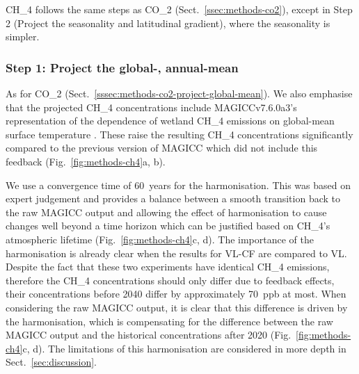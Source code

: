 CH_4 follows the same steps as CO_2 (Sect.~\ref{ssec:methods-co2}),
except in Step 2 (Project the seasonality and latitudinal gradient),
where the seasonality is simpler.

\subsubsection{Step 1: Project the global-, annual-mean}
\label{sssec:methods-ch4-project-global-mean}

As for CO_2 (Sect.~\ref{sssec:methods-co2-project-global-mean}).
We also emphasise that the projected CH_4 concentrations
include MAGICCv7.6.0a3's representation of the dependence of
wetland CH_4 emissions on global-mean surface temperature \citep{sloughter_magicc-ch4-feedbacks_2026}.
These raise the resulting CH_4 concentrations significantly
compared to the previous version of MAGICC which did not include this feedback (Fig.~\ref{fig:methods-ch4}a, b).

We use a convergence time of
60~years for the harmonisation.
This was based on expert judgement and provides a balance between
a smooth transition back to the raw MAGICC output
and allowing the effect of harmonisation to cause changes
well beyond a time horizon which can be justified based on CH_4's atmospheric lifetime (Fig.~\ref{fig:methods-ch4}c, d).
The importance of the harmonisation is already clear when the results for VL-CF are compared to VL.
Despite the fact that these two experiments have identical CH_4 emissions,
therefore the CH_4 concentrations should only differ due to feedback effects,
their concentrations before 2040 differ by approximately 70~ppb at most.
When considering the raw MAGICC output, it is clear that this difference is driven by the harmonisation,
which is compensating for the difference between the raw MAGICC output and the historical concentrations after 2020
(Fig.~\ref{fig:methods-ch4}c, d).
The limitations of this harmonisation are considered in more depth in Sect.~\ref{sec:discussion}.

